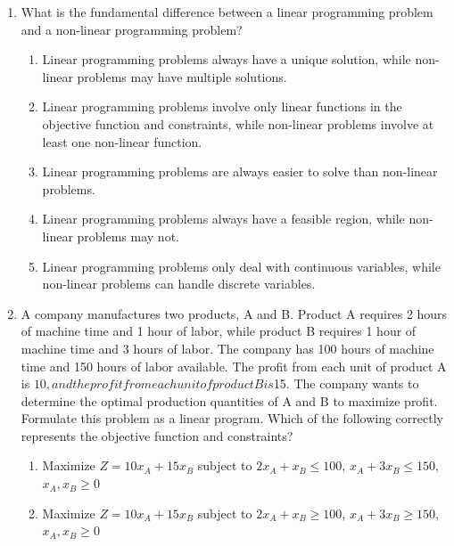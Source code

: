 \documentclass{article}%
\begin{document}
\begin{enumerate}
\begin{enumerate}
\item The feasible region is only important if the problem is unbounded.%
\item The feasible region is the set of all possible objective function values.%
\item The feasible region is only relevant in graphical methods, not in the simplex method.%
\end{enumerate}%
\vspace{1em}%
\item What is the fundamental difference between a linear programming problem and a non-linear programming problem?%
\begin{enumerate}%
\item Linear programming problems always have a unique solution, while non-linear problems may have multiple solutions.%
\item Linear programming problems involve only linear functions in the objective function and constraints, while non-linear problems involve at least one non-linear function.%
\item Linear programming problems are always easier to solve than non-linear problems.%
\item Linear programming problems always have a feasible region, while non-linear problems may not.%
\item Linear programming problems only deal with continuous variables, while non-linear problems can handle discrete variables.%
\end{enumerate}%
\vspace{1em}%
\item A company manufactures two products, A and B. Product A requires 2 hours of machine time and 1 hour of labor, while product B requires 1 hour of machine time and 3 hours of labor. The company has 100 hours of machine time and 150 hours of labor available. The profit from each unit of product A is $10, and the profit from each unit of product B is $15.  The company wants to determine the optimal production quantities of A and B to maximize profit. Formulate this problem as a linear program. Which of the following correctly represents the objective function and constraints?%
\begin{enumerate}%
\item Maximize $Z = 10x_A + 15x_B$ subject to $2x_A + x_B \le 100$, $x_A + 3x_B \le 150$, $x_A, x_B \ge 0$%
\item Maximize $Z = 10x_A + 15x_B$ subject to $2x_A + x_B \ge 100$, $x_A + 3x_B \ge 150$, $x_A, x_B \ge 0$%

\end{enumerate}
\end{enumerate}
\end{document}
